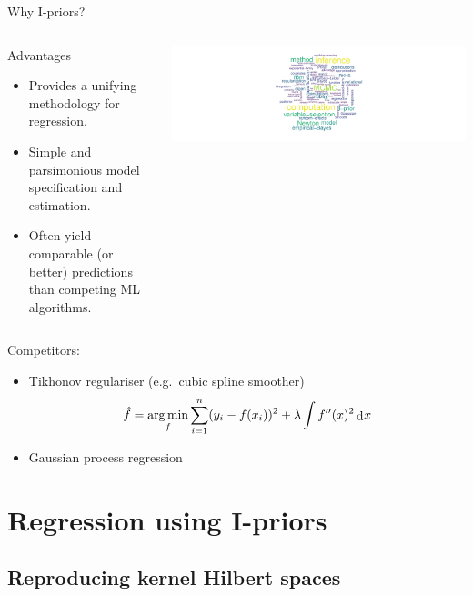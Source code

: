 \documentclass[,aspectratio=43]{beamer}
\DeclareMathOperator*{\argmin}{arg\,min}
\DeclareMathOperator{\dd}{d}
\newcommand{\dint}{\dd\hspace{0.5pt}\!}
\begin{document}
\begin{frame}{Why I-priors?}
\protect\hypertarget{why-i-priors}{}
\begin{columns}[T]
\begin{column}{0.48\textwidth}
Advantages

\begin{itemize}
\item
  Provides a unifying methodology for regression.
\item
  Simple and parsimonious model specification and estimation.
\item
  Often yield comparable (or better) predictions than competing ML
  algorithms.
\end{itemize}
\end{column}

\begin{column}{0.48\textwidth}
\includegraphics[width=0.9\linewidth]{figure/wordcloud}
\end{column}
\end{columns}

Competitors:

\begin{itemize}
\item
  Tikhonov regulariser (e.g.~cubic spline smoother) \[
  \hat f = \argmin_f \sum_{i=1}^n (y_i - f(x_i))^2 + \lambda \int f''(x)^2 \dint x
  \]
\item
  Gaussian process regression
\end{itemize}
\end{frame}

\hypertarget{regression-using-i-priors}{%
\section{Regression using I-priors}\label{regression-using-i-priors}}

\hypertarget{reproducing-kernel-hilbert-spaces}{%
\subsection{Reproducing kernel Hilbert
spaces}\label{reproducing-kernel-hilbert-spaces}}
\end{document}
